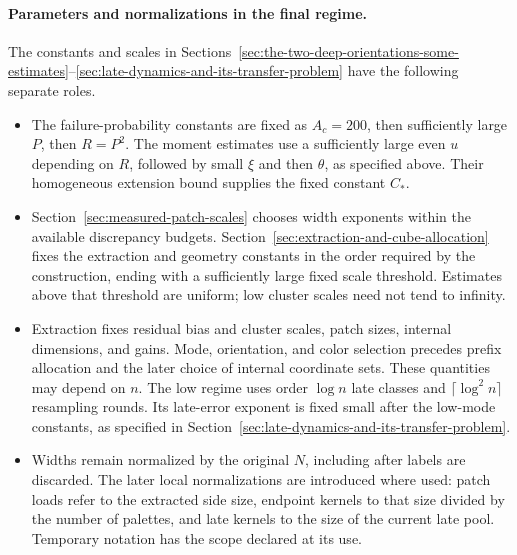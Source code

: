 \paragraph{Parameters and normalizations in the final regime.}
The constants and scales in Sections~\ref{sec:the-two-deep-orientations-some-estimates}--\ref{sec:late-dynamics-and-its-transfer-problem} have the following separate roles.
\begin{itemize}
\item The failure-probability constants are fixed as
\(A_c=200\), then sufficiently large \(P\), then \(R=P^2\).
The moment estimates use a sufficiently large even \(u\) depending on
\(R\), followed by small \(\xi\) and then \(\theta\), as specified above.
Their homogeneous extension bound supplies the fixed constant \(C_*\).
\item Section~\ref{sec:measured-patch-scales} chooses width exponents
within the available discrepancy budgets.
Section~\ref{sec:extraction-and-cube-allocation} fixes the extraction and
geometry constants in the order required by the construction, ending with
a sufficiently large fixed scale threshold. Estimates above that threshold
are uniform; low cluster scales need not tend to infinity.
\item Extraction fixes residual bias and cluster scales, patch sizes,
internal dimensions, and gains. Mode, orientation, and color selection
precedes prefix allocation and the later choice of internal coordinate
sets. These quantities may depend on \(n\). The low regime uses order \(\log n\)
late classes and \(\lceil\log^2 n\rceil\) resampling rounds. Its late-error
exponent is fixed small after the low-mode constants, as specified in
Section~\ref{sec:late-dynamics-and-its-transfer-problem}.
\item Widths remain normalized by the original \(N\), including after
labels are discarded. The later local normalizations are introduced where
used: patch loads refer to the extracted side size, endpoint kernels to that
size divided by the number of palettes, and late kernels to the size of the
current late pool.
Temporary notation has the scope declared at its use.
\end{itemize}
